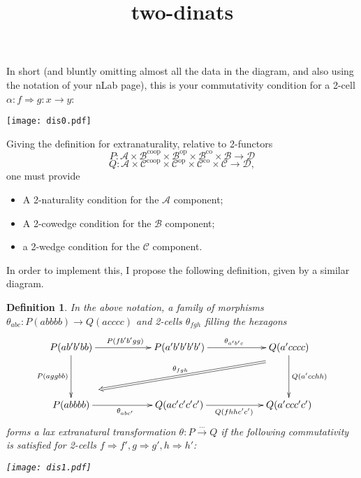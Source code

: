 \documentclass{article}
\title{two-dinats}
\newtheorem{definition}[section]{Definition}
\def\A{\mathcal{A}}
\def\B{\mathcal{B}}
\def\C{\mathcal{C}}
\def\D{\mathcal{D}}
\def\opp{\text{op}}
\def\co{\text{co}}
\def\coop{\text{coop}}
\begin{document}
\maketitle

In short (and bluntly omitting almost all the data in the diagram, and also using the notation of your nLab page), this is your commutativity condition for a 2-cell $\alpha : f \Rightarrow g : x \to y$:
\begin{center}
\texttt{[image: dis0.pdf]}
\end{center}
Giving the definition for extranaturality, relative to 2-functors 
\[ 
P : \A \times \B^\coop \times \B^\opp \times \B^\co \times \B \to \D 
\]
\[ 
Q : \A \times \C^\coop \times \C^\opp \times \C^\co \times \C \to \D ,
\]
one must provide 
\begin{itemize}
    \item A 2-naturality condition for the $\A$ component;
    \item A 2-cowedge condition for the $\B$ component;
    \item a 2-wedge condition for the $\C$ component.
\end{itemize}
In order to implement this, I propose the following definition, given by a similar diagram.
\begin{definition}
In the above notation, a family of morphisms $\theta_{abc} : P(abbbb)\to Q(acccc)$ and 2-cells $\theta_{fgh}$ filling the hexagons
\[
\xymatrix@C=2cm@R=1.5cm{
	P(ab'b'bb)\ar[r]^{P(fb'b'gg)} \ar[d]_{P(aggbb)} &P(a'b'b'b'b')\ar[r]^{\theta_{a'b'c}}&Q(a'cccc) \ar[d]^{Q(a'cchh)}\\
	P(abbbb)\ar[r]_{\theta_{abc'}} &Q(ac'c'c'c')\ar[r]_{Q(fhhc'c')} &Q(a'ccc'c')
	\ar@{=>}(70,-5);(10,-15)_{\theta_{fgh}}
}
\]
forms a \emph{lax extranatural transformation} $\theta : P\xrightarrow{...}Q$ if the following commutativity is satisfied for 2-cells $f\Rightarrow f', g\Rightarrow g', h\Rightarrow h'$:
\begin{center}
\texttt{[image: dis1.pdf]}
\end{center}
\end{definition}
\end{document}
